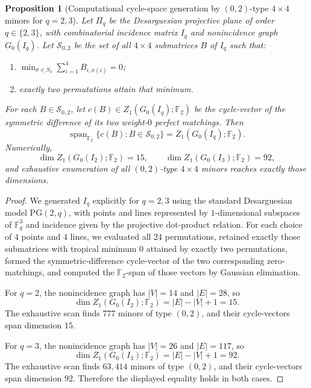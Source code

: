 \documentclass[11pt]{amsart}
\numberwithin{equation}{section}
\theoremstyle{plain}
\newtheorem{proposition}[theorem]{Proposition}
\theoremstyle{definition}
\theoremstyle{remark}
\begin{document}
\begin{proposition}[Computational cycle-space generation by $(0,2)$-type $4\times4$ minors for $q=2,3$]
\label{prop:q23-cycle-generation}
Let $\Pi_q$ be the Desarguesian projective plane of order $q\in\{2,3\}$, with combinatorial incidence matrix $I_q$ and nonincidence
graph $G_0(I_q)$. Let $\mathcal S_{0,2}$ be the set of all $4\times4$ submatrices $B$ of $I_q$ such that:
\begin{enumerate}[leftmargin=2em]
  \item $\min_{\sigma\in S_4} \sum_{i=1}^4 B_{i,\sigma(i)} = 0$;
  \item exactly two permutations attain that minimum.
\end{enumerate}
For each $B\in \mathcal S_{0,2}$, let $c(B)\in Z_1(G_0(I_q);\mathbb F_2)$ be the cycle-vector of the symmetric difference of its two
weight-$0$ perfect matchings. Then
\[
\operatorname{span}_{\mathbb F_2}\{c(B): B\in\mathcal S_{0,2}\}
=
Z_1(G_0(I_q);\mathbb F_2).
\]
Numerically,
\[
\dim Z_1(G_0(I_2);\mathbb F_2)=15,
\qquad
\dim Z_1(G_0(I_3);\mathbb F_2)=92,
\]
and exhaustive enumeration of all $(0,2)$-type $4\times4$ minors reaches exactly those dimensions.
\end{proposition}

\begin{proof}
We generated $I_q$ explicitly for $q=2,3$ using the standard Desarguesian model $\mathrm{PG}(2,q)$, with points and lines represented by
$1$-dimensional subspaces of $\mathbb F_q^3$ and incidence given by the projective dot-product relation. For each choice of
$4$ points and $4$ lines, we evaluated all $24$ permutations, retained exactly those submatrices with tropical minimum $0$ attained by
exactly two permutations, formed the symmetric-difference cycle-vector of the two corresponding zero-matchings, and computed the
$\mathbb F_2$-span of those vectors by Gaussian elimination.

For $q=2$, the nonincidence graph has $|V|=14$ and $|E|=28$, so
\[
\dim Z_1(G_0(I_2);\mathbb F_2)=|E|-|V|+1=15.
\]
The exhaustive scan finds $777$ minors of type $(0,2)$, and their cycle-vectors span dimension $15$.

For $q=3$, the nonincidence graph has $|V|=26$ and $|E|=117$, so
\[
\dim Z_1(G_0(I_3);\mathbb F_2)=|E|-|V|+1=92.
\]
The exhaustive scan finds $63{,}414$ minors of type $(0,2)$, and their cycle-vectors span dimension $92$.
Therefore the displayed equality holds in both cases.
\end{proof}
\end{document}
